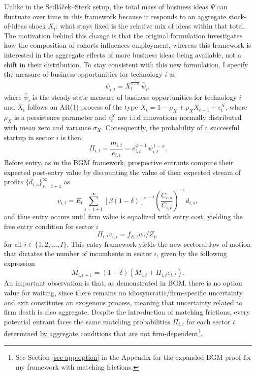 \documentclass[a4paper,12pt]{article} %
\numberwithin{equation}{section} %
\numberwithin{figure}{section}
\numberwithin{table}{section}
\begin{document}
Unlike in the Sedláček–Sterk setup, the total mass of business ideas $\Psi$ can fluctuate over time in 
this framework because it responds to an aggregate stock-of-ideas shock $X_t$; what stays fixed 
is the relative mix of ideas within that total. The motivation behind this change is that
the original formulation investigates how the composition of cohorts influences employment, whereas this framework is interested in the aggregate 
effects of more business ideas being available, not a shift in their distribution. To stay consistent with this new formulation, I specify the measure 
of business opportunities for technology \(i\) as 
\begin{equation}
  \psi_{i,t} =X_t^{\frac{1}{1-\phi}}\,\bar{\psi}_i, \label{eq:psilaw}
\end{equation}
where \(\bar{\psi}_i\) is the steady-state measure of business opportunities for technology \(i\) and $X_t$ follows an AR(1) process of the type 
$X_t = 1 - \rho_X + \rho_X X_{t-1} + \epsilon^X_t$, where $\rho_X$ is a persistence parameter and $\epsilon^X_t$ are i.i.d innovations 
normally distributed with mean zero and variance $\sigma_X$. Consequently, the probability of a successful startup in sector $i$ is then:
\begin{equation}
  \Pi_{i,t} = \frac{m_{i,t}}{e_{i,t}} = e_{i,t}^{\phi-1}\,\psi_{i,t}^{\,1-\phi}. \label{eq:probability}
\end{equation}
Before entry, as in the BGM framework, prospective entrants compute their expected post-entry value by discounting the value of their expected stream
of profits $\{d_{i,s}\}_{s=t+1}^\infty$ as
\begin{equation}
  v_{i,t} = E_t \sum_{s = t+1}^{\infty} \left[ \beta (1 - \delta) \right]^{s - t} \left( \frac{C_{i,s}}{C_{i,t}} \right)^{-1} d_{i,s}, \label{eq:value}
\end{equation}
and thus entry occurs until firm value is equalized with entry cost, yielding the free entry condition for sector $i$ 
\begin{equation}
  \Pi_{i,t}v_{i,t} = f_{E,t}w_t/Z_t , \label{eq:freeentry}
\end{equation}
for all $i \in \{1,2,..., I\}$. This entry framework yields the new sectoral law of motion that dictates the number of incumbents in sector $i$, 
given by the following expression
\begin{equation}
  M_{i,t+1} = (1-\delta)(M_{i,t} + \Pi_{i,t}e_{i,t}). \label{eq:entrants}
\end{equation}
An important observation is that, as demonstrated in BGM, there is no option value for waiting, since there remains no 
idiosyncratic/firm-specific uncertainty and exit constitutes an exogenous process, meaning that uncertainty related to firm death is also aggregate. 
Despite the introduction of matching frictions, every potential entrant faces the same matching probabilities $\Pi_{i,t}$ for each sector $i$ 
determined by aggregate conditions that are not firm-dependent\footnote{See Section \ref{sec-app:option} in the Appendix for the expanded BGM 
proof for my framework with matching frictions.}.
\end{document}
